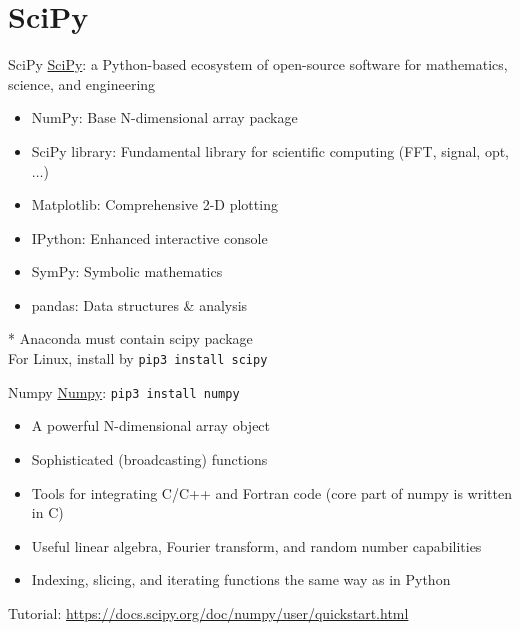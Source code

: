 \documentclass{../TexTemplate/myslide}
\begin{document}
\section{SciPy}
\begin{frame}
\sectionpage
\end{frame}

\begin{frame}[fragile]{SciPy}
\href{https://www.scipy.org/}{SciPy}: a Python-based ecosystem of open-source software for mathematics, science, and engineering
\begin{itemize}
	\item NumPy: Base N-dimensional array package
	\item SciPy library: Fundamental library for scientific computing (FFT, signal, opt, $\ldots$)
	\item Matplotlib: Comprehensive 2-D plotting
	\item IPython: Enhanced interactive console
	\item SymPy: Symbolic mathematics
	\item pandas: Data structures \& analysis
\end{itemize}
* Anaconda must contain scipy package\\
For Linux, install by \verb'pip3 install scipy'
\end{frame}

\begin{frame}[fragile]{Numpy}
\href{https://numpy.org/}{Numpy}: \verb'pip3 install numpy' 
\begin{itemize}
	\item A powerful N-dimensional array object
	\item Sophisticated (broadcasting) functions
	\item Tools for integrating C/C++ and Fortran code (core part of numpy is written in C)
	\item Useful linear algebra, Fourier transform, and random number capabilities
	\item Indexing, slicing, and iterating functions the same way as in Python
\end{itemize}
Tutorial: \url{https://docs.scipy.org/doc/numpy/user/quickstart.html}
\end{frame}
\end{document}
